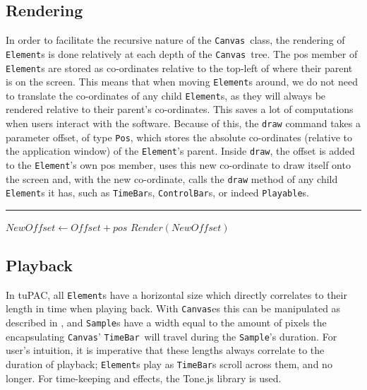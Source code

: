 \documentclass[12pt,a4paper,oneside,openright]{report}
\newcommand{\element}{\texttt{Element}}
\newcommand{\pos}{\texttt{Pos}}
\newcommand{\canvas}{\texttt{Canvas}}
\newcommand{\controlbar}{\texttt{ControlBar}}
\newcommand{\timebar}{\texttt{TimeBar}}
\newcommand{\playable}{\texttt{Playable}}
\newcommand{\sample}{\texttt{Sample}}
\begin{document}
\subsection{Rendering}
In order to facilitate the recursive nature of the \canvas\ class, the rendering of \element s is done relatively at each depth of the \canvas\ tree. The pos member of \element s are stored as co-ordinates relative to the top-left of where their parent is on the screen. This means that when moving \element s around, we do not need to translate the co-ordinates of any child \element s, as they will always be rendered relative to their parent's co-ordinates. This saves a lot of computations when users interact with the software. Because of this, the \verb|draw| command takes a parameter offset, of type \pos, which stores the absolute co-ordinates (relative to the application window) of the \element's parent. Inside \verb|draw|, the offset is added to the \element's own pos member, uses this new co-ordinate to draw itself onto the screen and, with the new co-ordinate, calls the \verb|draw| method of any child \element s it has, such as \timebar s, \controlbar s, or indeed \playable s.

\begin{algorithm}
\DontPrintSemicolon
{}
\vspace{1mm} \hrule \vspace{1mm}
\nl $NewOffset \gets Offset + pos$\;
\nl $Render(NewOffset)$\;
\nl {}
\caption{Outline of \texttt{draw} function in \element\ classes.}\label{alg:draw}
\end{algorithm}


\subsection{Playback}\label{sec:playback}
In tuPAC, all \element s have a horizontal size which directly correlates to their length in time when playing back. With \canvas es this can be manipulated as described in , and \sample s have a width equal to the amount of pixels the encapsulating \canvas' \timebar\ will travel during the \sample's duration. For user's intuition, it is imperative that these lengths always correlate to the duration of playback; \element s play as \timebar s scroll across them, and no longer. For time-keeping and effects, the Tone.js library is used.
\end{document}
